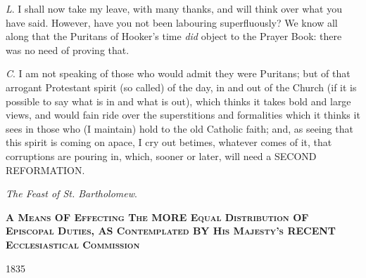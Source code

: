 \emph{L}. I shall now take my leave, with many
thanks, and will think over what you have said. However, have you not
been labouring superfluously? We know all along that the Puritans of
Hooker's time \emph{did} object to the Prayer Book: there was no need
of proving that.

\emph{C}. I am not speaking of those who would
admit they were Puritans; but of that arrogant Protestant spirit (so
called) of the day, in and out of the Church (if it is possible to say
what is in and what is out), which thinks it takes bold and large
views, and would fain ride over the superstitions and formalities
which it thinks it sees in those who (I maintain) hold to the old
Catholic faith; and, as seeing that this spirit is coming on apace, I
cry out betimes, whatever comes of it, that corruptions are pouring
in, which, sooner or later, will need a SECOND
REFORMATION.

\emph{The Feast of St. Bartholomew}.


\textbf{A
M\textsc{eans} OF E\textsc{ffecting} T\textsc{he} MORE E\textsc{qual}
D\textsc{istribution} OF E\textsc{piscopal}
D\textsc{uties}, AS C\textsc{ontemplated} BY
H\textsc{is} M\textsc{ajesty's} RECENT E\textsc{cclesiastical} C\textsc{ommission}}

1835


